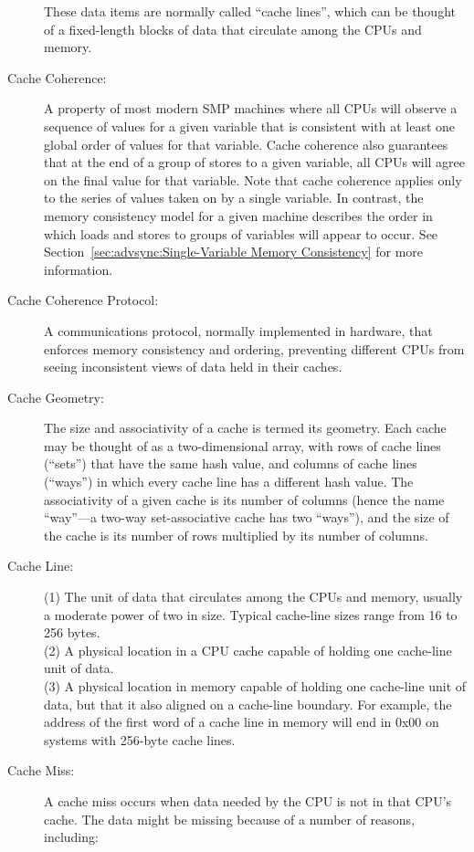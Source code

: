 \begin{description}
	These data items are normally called ``cache lines'', which
	can be thought of a fixed-length blocks of data that circulate
	among the CPUs and memory.
\item[Cache Coherence:]
	A property of most modern SMP machines where all CPUs will
	observe a sequence of values for a given variable that is
	consistent with at least one global order of values for
	that variable.
	Cache coherence also guarantees that at the end of a group
	of stores to a given variable, all CPUs will agree
	on the final value for that variable.
	Note that cache coherence applies only to the series of values
	taken on by a single variable.
	In contrast, the memory consistency model for a given machine
	describes the order in which loads and stores to groups of
	variables will appear to occur.
	See Section~\ref{sec:advsync:Single-Variable Memory Consistency}
	for more information.
\item[Cache Coherence Protocol:]
	A communications protocol, normally implemented in hardware,
	that enforces memory consistency and ordering, preventing
	different CPUs from seeing inconsistent views of data held
	in their caches.
\item[Cache Geometry:]
	The size and associativity of a cache is termed its geometry.
	Each cache may be thought of as a two-dimensional array,
	with rows of cache lines (``sets'') that have the same hash
	value, and columns of cache lines (``ways'') in which every
	cache line has a different hash value.
	The associativity of a given cache is its number of
	columns (hence the name ``way''---a two-way set-associative
	cache has two ``ways''), and the size of the cache is its
	number of rows multiplied by its number of columns.
\item[Cache Line:]
	(1) The unit of data that circulates among the CPUs and memory,
	usually a moderate power of two in size.
	Typical cache-line sizes range from 16 to 256 bytes. \\
	(2) A physical location in a CPU cache capable of holding
	one cache-line unit of data. \\
	(3) A physical location in memory capable of holding one
	cache-line unit of data, but that it also aligned
	on a cache-line boundary.
	For example, the address of the first word of a cache line
	in memory will end in 0x00 on systems with 256-byte cache lines.
\item[Cache Miss:]
	A cache miss occurs when data needed by the CPU is not in
	that CPU's cache.
	The data might be missing because of a number of reasons,
	including:

\end{description}
